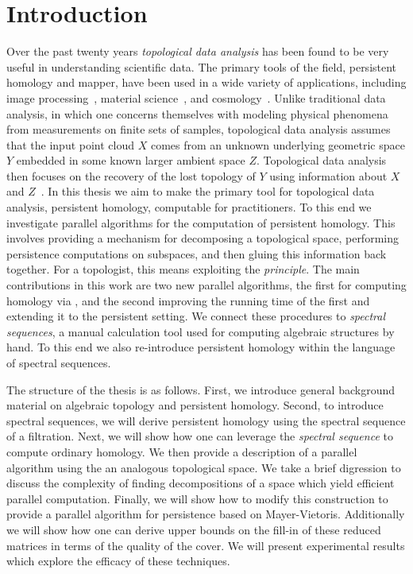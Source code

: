 \chapter{Introduction}
Over the past twenty years \emph{topological data analysis} has been found to be very useful in understanding scientific data. The primary tools of the field, persistent homology and mapper, have been used in a wide variety of applications, including image processing~\cite{cid-lbs-08}, material science~\cite{SW-measuring-shape}, and cosmology~\cite{cosmic-web}. Unlike traditional data analysis, in which one concerns themselves with modeling physical phenomena from measurements on finite sets of samples, topological data analysis assumes that the input point cloud $X$ comes from an unknown underlying geometric space $Y$ embedded in some known larger ambient space $Z$. Topological data analysis then focuses on the recovery of the lost topology of $Y$ using information about $X$ and $Z$~\cite{c-tnd-09}. In this thesis we aim to make the primary tool for topological data analysis, persistent homology, computable for practitioners. To this end we investigate parallel algorithms for the computation of persistent homology. This involves providing a mechanism for decomposing a topological space, performing persistence computations on subspaces, and then gluing this information back together. For a topologist, this means exploiting the \emph{\mv principle}. The main contributions in this work are two new parallel algorithms, the first for computing homology via \mv{}, and the second improving the running time of the first and extending it to the persistent setting. We connect these procedures to \emph{spectral sequences}, a manual calculation tool used for computing algebraic structures by hand. To this end we also re-introduce persistent homology within the language of spectral sequences.

The structure of the thesis is as follows. First, we introduce general background material on algebraic topology and persistent homology. Second, to introduce spectral sequences, we will derive persistent homology using the spectral sequence of a filtration. Next, we will show how one can leverage the \emph{\mv spectral sequence} to compute ordinary homology. We then provide a description of a parallel algorithm using the \mvb{} an analogous topological space. We take a brief digression to discuss the complexity of finding decompositions of a space which yield efficient parallel computation. Finally, we will show how to modify this construction to provide a parallel algorithm for persistence based on Mayer-Vietoris. Additionally we will show how one can derive upper bounds on the fill-in of these reduced matrices in terms of the quality of the cover. We will present experimental results which explore the efficacy of these techniques.

